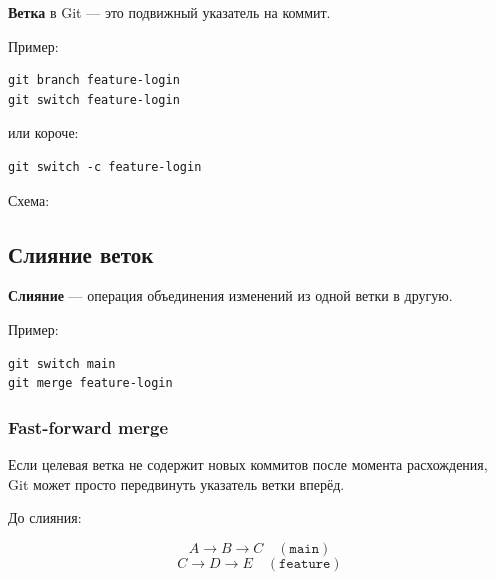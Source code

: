 \documentclass[12pt,a4paper]{article}
\begin{document}
\textbf{Ветка} в Git --- это подвижный указатель на коммит.

Пример:

\begin{lstlisting}
git branch feature-login
git switch feature-login
\end{lstlisting}

или короче:

\begin{lstlisting}
git switch -c feature-login
\end{lstlisting}

Схема:

\begin{center}
\end{center}

\subsection{Слияние веток}

\textbf{Слияние} --- операция объединения изменений из одной ветки в другую.

Пример:

\begin{lstlisting}
git switch main
git merge feature-login
\end{lstlisting}

\subsubsection{Fast-forward merge}

Если целевая ветка не содержит новых коммитов после момента расхождения, Git может просто передвинуть указатель ветки вперёд.

До слияния:

\[
A \rightarrow B \rightarrow C \quad (\texttt{main})
\]
\[
C \rightarrow D \rightarrow E \quad (\texttt{feature})
\]
\end{document}
